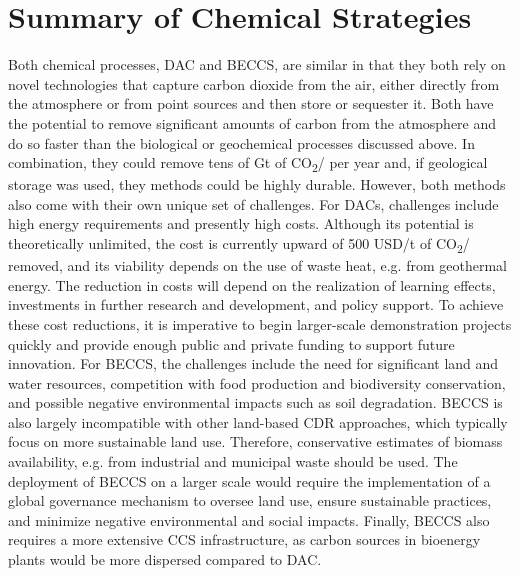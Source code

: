\section{Summary of Chemical Strategies}
Both chemical processes, DAC and BECCS, are similar in that they both rely on novel technologies that capture carbon dioxide from the air, either directly from the atmosphere or from point sources and then store or sequester it. Both have the potential to remove significant amounts of carbon from the atmosphere and do so faster than the biological or geochemical processes discussed above. In combination, they could remove tens of Gt of CO\textsubscript{2}/ per year and, if geological storage was used, they methods could be highly durable.
However, both methods also come with their own unique set of challenges. For DACs, challenges include high energy requirements and presently high costs. Although its potential is theoretically unlimited, the cost is currently upward of 500 USD/t of CO\textsubscript{2}/ removed, and its viability depends on the use of waste heat, e.g. from geothermal energy. The reduction in costs will depend on the realization of learning effects, investments in further research and development, and policy support. To achieve these cost reductions, it is imperative to begin larger-scale demonstration projects quickly and provide enough public and private funding to support future innovation.
For BECCS, the challenges include the need for significant land and water resources, competition with food production and biodiversity conservation, and possible negative environmental impacts such as soil degradation. BECCS is also largely incompatible with other land-based CDR approaches, which typically focus on more sustainable land use. Therefore, conservative estimates of biomass availability, e.g. from industrial and municipal waste should be used. The deployment of BECCS on a larger scale would require the implementation of a global governance mechanism to oversee land use, ensure sustainable practices, and minimize negative environmental and social impacts. Finally, BECCS also requires a more extensive CCS infrastructure, as carbon sources in bioenergy plants would be more dispersed compared to DAC.